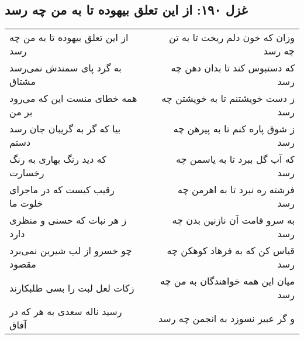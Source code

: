 \begin{center}
\section*{غزل ۱۹۰: از این تعلق بیهوده تا به من چه رسد}
\label{sec:190}
\begin{longtable}{l p{0.5cm} r}
از این تعلق بیهوده تا به من چه رسد
&&
وزان که خون دلم ریخت تا به تن چه رسد
\\
به گرد پای سمندش نمی‌رسد مشتاق
&&
که دستبوس کند تا بدان دهن چه رسد
\\
همه خطای منست این که می‌رود بر من
&&
ز دست خویشتنم تا به خویشتن چه رسد
\\
بیا که گر به گریبان جان رسد دستم
&&
ز شوق پاره کنم تا به پیرهن چه رسد
\\
که دید رنگ بهاری به رنگ رخسارت
&&
که آب گل ببرد تا به یاسمن چه رسد
\\
رقیب کیست که در ماجرای خلوت ما
&&
فرشته ره نبرد تا به اهرمن چه رسد
\\
ز هر نبات که حسنی و منظری دارد
&&
به سرو قامت آن نازنین بدن چه رسد
\\
چو خسرو از لب شیرین نمی‌برد مقصود
&&
قیاس کن که به فرهاد کوهکن چه رسد
\\
زکات لعل لبت را بسی طلبکارند
&&
میان این همه خواهندگان به من چه رسد
\\
رسید ناله سعدی به هر که در آفاق
&&
و گر عبیر نسوزد به انجمن چه رسد
\\
\end{longtable}
\end{center}
